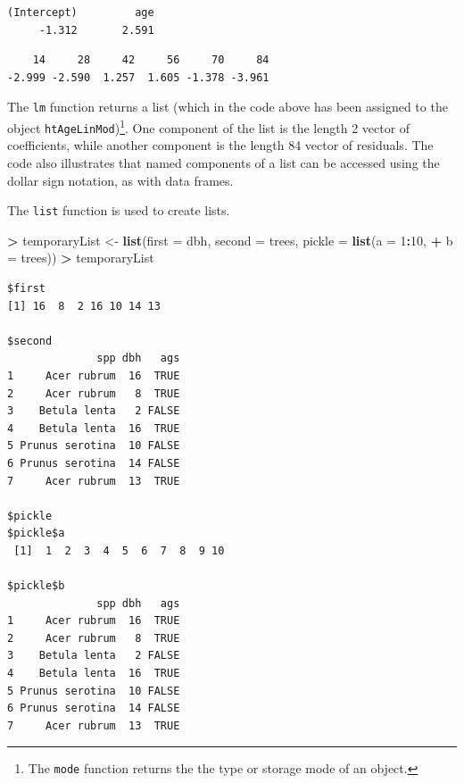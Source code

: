 \documentclass[]{krantz}
\makeatletter
\newenvironment{Shaded}{\begin{snugshade}}{\end{snugshade}}
\newcommand{\KeywordTok}[1]{\textcolor[rgb]{0.27,0.27,0.27}{\textbf{#1}}}
\newcommand{\DataTypeTok}[1]{\textcolor[rgb]{0.27,0.27,0.27}{#1}}
\newcommand{\DecValTok}[1]{\textcolor[rgb]{0.06,0.06,0.06}{#1}}
\newcommand{\StringTok}[1]{\textcolor[rgb]{0.5,0.5,0.5}{#1}}
\newcommand{\OperatorTok}[1]{\textcolor[rgb]{0.43,0.43,0.43}{\textbf{#1}}}
\newcommand{\NormalTok}[1]{#1}
\newenvironment{kframe}{%
\medskip{}
\setlength{\fboxsep}{.8em}
 \def\at@end@of@kframe{}%
 \ifinner\ifhmode%
  \def\at@end@of@kframe{\end{minipage}}%
  \begin{minipage}{\columnwidth}%
 \fi\fi%
 \def\FrameCommand##1{\hskip\@totalleftmargin \hskip-\fboxsep
 \colorbox{shadecolor}{##1}\hskip-\fboxsep
     \hskip-\linewidth \hskip-\@totalleftmargin \hskip\columnwidth}%
 \MakeFramed {\advance\hsize-\width
   \@totalleftmargin\z@ \linewidth\hsize
   \@setminipage}}%
 {\par\unskip\endMakeFramed%
 \at@end@of@kframe}
\renewenvironment{Shaded}{\begin{kframe}}{\end{kframe}}
\theoremstyle{definition}
\theoremstyle{definition}
\theoremstyle{definition}
\theoremstyle{remark}
\makeatother
\begin{document}
\begin{verbatim}
(Intercept)         age 
     -1.312       2.591 
\end{verbatim}

\begin{Shaded}
\end{Shaded}

\begin{verbatim}
    14     28     42     56     70     84 
-2.999 -2.590  1.257  1.605 -1.378 -3.961 
\end{verbatim}

The \texttt{lm} function returns a list (which in the code above has
been assigned to the object \texttt{htAgeLinMod})\footnote{The
  \texttt{mode} function returns the the type or storage mode of an
  object.}. One component of the list is the length 2 vector of
coefficients, while another component is the length 84 vector of
residuals. The code also illustrates that named components of a list can
be accessed using the dollar sign notation, as with data frames.

The \texttt{list} function is used to create lists.

\begin{Shaded}
\begin{Highlighting}[]
\OperatorTok{>}\StringTok{ }\NormalTok{temporaryList <-}\StringTok{ }\KeywordTok{list}\NormalTok{(}\DataTypeTok{first =}\NormalTok{ dbh, }\DataTypeTok{second =}\NormalTok{ trees, }\DataTypeTok{pickle =} \KeywordTok{list}\NormalTok{(}\DataTypeTok{a =} \DecValTok{1}\OperatorTok{:}\DecValTok{10}\NormalTok{, }
\OperatorTok{+}\StringTok{   }\DataTypeTok{b =}\NormalTok{ trees))}
\OperatorTok{>}\StringTok{ }\NormalTok{temporaryList}
\end{Highlighting}
\end{Shaded}

\begin{verbatim}
$first
[1] 16  8  2 16 10 14 13

$second
              spp dbh   ags
1     Acer rubrum  16  TRUE
2     Acer rubrum   8  TRUE
3    Betula lenta   2 FALSE
4    Betula lenta  16  TRUE
5 Prunus serotina  10 FALSE
6 Prunus serotina  14 FALSE
7     Acer rubrum  13  TRUE

$pickle
$pickle$a
 [1]  1  2  3  4  5  6  7  8  9 10

$pickle$b
              spp dbh   ags
1     Acer rubrum  16  TRUE
2     Acer rubrum   8  TRUE
3    Betula lenta   2 FALSE
4    Betula lenta  16  TRUE
5 Prunus serotina  10 FALSE
6 Prunus serotina  14 FALSE
7     Acer rubrum  13  TRUE
\end{verbatim}
\end{document}
